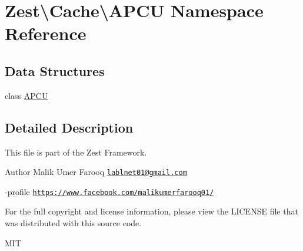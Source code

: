 \hypertarget{namespace_zest_1_1_cache_1_1_a_p_c_u}{}\section{Zest\textbackslash{}Cache\textbackslash{}A\+P\+CU Namespace Reference}
\label{namespace_zest_1_1_cache_1_1_a_p_c_u}
\subsection*{Data Structures}
\begin{DoxyCompactItemize}
\item 
class \mbox{\hyperlink{class_zest_1_1_cache_1_1_a_p_c_u_1_1_a_p_c_u}{A\+P\+CU}}
\end{DoxyCompactItemize}


\subsection{Detailed Description}
This file is part of the Zest Framework.

\begin{DoxyAuthor}{Author}
Malik Umer Farooq \href{mailto:lablnet01@gmail.com}{\tt lablnet01@gmail.\+com} 

-\/profile \href{https://www.facebook.com/malikumerfarooq01/}{\tt https\+://www.\+facebook.\+com/malikumerfarooq01/}
\end{DoxyAuthor}
For the full copyright and license information, please view the L\+I\+C\+E\+N\+SE file that was distributed with this source code.

M\+IT 